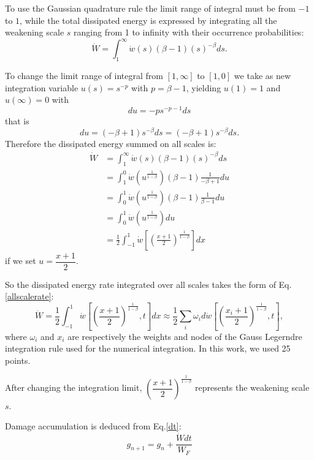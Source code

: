 \documentclass[3p,times,number,review]{elsarticle}
\begin{document}
To use the Gaussian quadrature rule the limit range of integral must be from $-1$ to $1$, while the total dissipated energy  is expressed by integrating all the weakening scale $s$ ranging from 1 to infinity with their occurrence probabilities:
$$\dot{W}=\int_{1}^{\infty}\dot{w}(s) (\beta-1)(s)^{-\beta}ds.$$

\noindent
To change the limit range of integral from $[1,\infty]$ to $[1,0]$ we take as new integration variable
$u(s)= s^{-p}$ with $p=\beta-1$, yielding $u(1)=1$ and  $u(\infty)=0$ with
$$du=-ps^{-p-1}ds$$ 
that is
$$du=(-\beta+1) s^{-\beta}ds=(-\beta+1)s^{-\beta} ds.$$
Therefore the dissipated energy summed on all scales is:
\begin{equation}
\begin{split}
\dot{W}&=\int_{1}^{\infty}\dot{w}(s) (\beta-1)(s)^{-\beta}ds
\\&=\int_{1}^{0}\dot{w}\left( u^{\frac{1}{1-\beta}}\right) (\beta-1) \frac{1}{-\beta+1}du
\\&=\int_{0}^{1}\dot{w}\left( u^{\frac{1}{1-\beta}}\right) (\beta-1) \frac{1}{\beta-1}du
\\&=\int_{0}^{1}\dot{w}\left( u^{\frac{1}{1-\beta}}\right)du
\\&=\frac{1}{2}\int_{-1}^{1}\dot{w}\left[  \left( \frac{x+1}{2}\right) ^{\frac{1}{1-\beta}}\right] dx
\end{split}
\label{allscale}
\end{equation}
if we set $u=\dfrac{x+1}{2}$.

So the dissipated energy rate integrated over all scales takes the form of Eq.\eqref{allscalerate}:
\begin{equation}
\dot{W}=\frac{1}{2}\int_{-1}^{1}\dot{w}\left[  \left( \frac{x+1}{2}\right) ^{\frac{1}{1-\beta}},t\right] dx\approx\frac{1}{2}\sum_{i}\omega_id\dot{w}\left[  \left( \frac{x_i+1}{2}\right) ^{\frac{1}{1-\beta}},t\right],
\label{allscalerate}
\end{equation}
where $\omega_i$ and $x_i$ are respectively the weights and nodes of the Gauss Legerndre integration rule used for the numerical integration. In this work, we used 25 points\cite{legendre}.

After changing the integration limit, $\left( \dfrac{x+1}{2}\right) ^{\frac{1}{1-\beta}}$ represents the weakening scale $s$. 

Damage accumulation is deduced from Eq.\eqref{dt}:
\begin{equation}
g_{n+1}=g_n+\dfrac{\dot{W}dt}{W_F}
\label{damage}
\end{equation}
\end{document}
